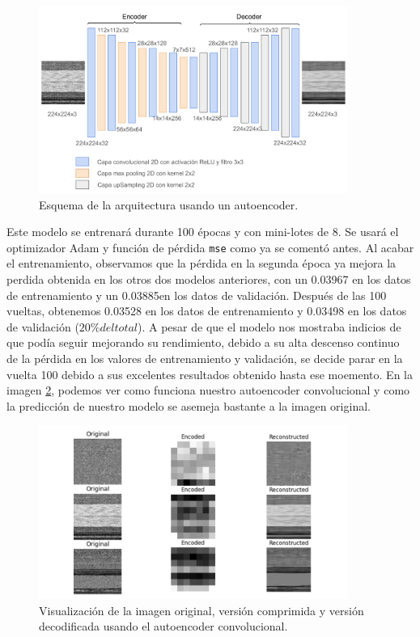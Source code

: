 \begin{figure}[h]
    \begin{center}
    \includegraphics[width=0.9\textwidth]{img/caeMMC.png}
    \end{center}
    \caption{Esquema de la arquitectura usando un autoencoder.}
    \label{img: caeMMC}
\end{figure} 

Este modelo se entrenará durante 100 épocas y con mini-lotes de 8. Se usará el optimizador Adam y función de pérdida \lstinline|mse| como ya se comentó antes. Al acabar el entrenamiento, observamos que la pérdida en la segunda época ya mejora la perdida obtenida en los otros dos modelos anteriores, con un 0.03967 en los datos de entrenamiento y un 0.03885en los datos de validación. Después de las 100 vueltas, obtenemos 0.03528 en los datos de entrenamiento y 0.03498 en los datos de validación ($20\% del total$). A pesar de que el modelo nos mostraba indicios de que podía seguir mejorando su rendimiento, debido a su alta descenso continuo de la pérdida en los valores de entrenamiento y validación, se decide parar en la vuelta 100 debido a sus excelentes resultados obtenido hasta ese moemento. En la imagen \ref{img: reprComprimMMC}, podemos ver como funciona nuestro autoencoder convolucional y como la predicción de nuestro modelo se asemeja bastante a la imagen original. 

\begin{figure}[h]
    \begin{center}
    \includegraphics[width=0.9\textwidth]{img/reprComprimMMC.png}
    \end{center}
    \caption{Visualización de la imagen original, versión comprimida y versión decodificada usando el autoencoder convolucional.}
    \label{img: reprComprimMMC}
\end{figure}

